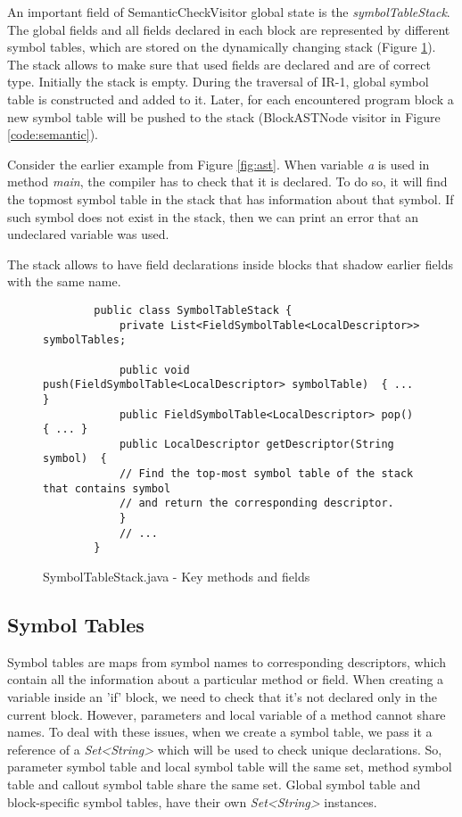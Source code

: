 \documentclass{article}[11pt]
\begin{document}
An important field of SemanticCheckVisitor global state is the \textit{symbolTableStack}. The global fields and all fields declared in each block are represented by different symbol tables, which are stored on the dynamically changing stack (Figure \ref{code:stack}). The stack allows to make sure that used fields are declared and are of correct type. Initially the stack is empty. During the traversal of IR-1, global symbol table is constructed and added to it. Later, for each encountered program block a new symbol table will be pushed to the stack (BlockASTNode visitor in Figure \ref{code:semantic}).

Consider the earlier example from Figure \ref{fig:ast}. When variable \textit{a} is used in method \textit{main}, the compiler has to check that it is declared. To do so, it will find the topmost symbol table in the stack that has information about that symbol. If such symbol does not exist in the stack, then we can print an error that an undeclared variable was used.

The stack allows to have field declarations inside blocks that shadow earlier fields with the same name.

\begin{figure}
    \begin{lstlisting}
        public class SymbolTableStack {
            private List<FieldSymbolTable<LocalDescriptor>> symbolTables;
        
            public void push(FieldSymbolTable<LocalDescriptor> symbolTable)  { ... }
            public FieldSymbolTable<LocalDescriptor> pop()  { ... }
            public LocalDescriptor getDescriptor(String symbol)  {
            // Find the top-most symbol table of the stack that contains symbol
            // and return the corresponding descriptor.
            }
            // ...
        }
    \end{lstlisting}
    \caption{SymbolTableStack.java - Key methods and fields}
    \label{code:stack}
\end{figure}

\subsection{Symbol Tables}
\label{sec:st}
Symbol tables are maps from symbol names to corresponding descriptors, which contain all the information about a particular method or field. When creating a variable inside an 'if' block, we need to check that it's not declared only in the current block. However, parameters and local variable of a method cannot share names. To deal with these issues, when we create a symbol table, we pass it a reference of a \textit{Set\textless String\textgreater} which will be used to check unique declarations. So, parameter symbol table and local symbol table will the same set, method symbol table and callout symbol table share the same set. Global symbol table and block-specific symbol tables, have their own \textit{Set\textless String\textgreater} instances.
\end{document}
